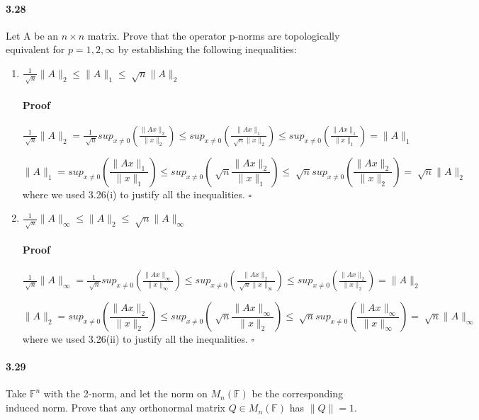 \documentclass[letterpaper,12pt]{article}
\theoremstyle{definition}
\begin{document}
\paragraph{3.28}  Let A be an $n \times n$ matrix. Prove that the operator p-norms are topologically equivalent for $p = 1,2,\infty$ by establishing the following inequalities: 


\begin{enumerate}[label=(\roman*)]

\item $ \frac{1}{\sqrt[]{n}} \| A \|_2 \le \| A \|_1 \le \sqrt[]{n} \| A \|_2 $

\paragraph{Proof} $ \frac{1}{\sqrt[]{n}} \| A \|_2 
= \frac{1}{\sqrt[]{n}} sup_{x \neq 0}( \frac{\| Ax \|_2}{\| x \|_2} )
\le sup_{x \neq 0}( \frac{\| Ax \|_1}{\sqrt[]{n} \| x \|_2})
\le sup_{x \neq 0}( \frac{\| Ax \|_1}{\| x \|_1})
= \| A \|_1$

$$\| A \|_1  =  sup_{x \neq 0}( \frac{\| Ax \|_1}{\| x \|_1})
\le sup_{x \neq 0}(\sqrt[]{n}  \frac{\| Ax \|_2}{\| x \|_1})
\le \sqrt[]{n} sup_{x \neq 0}( \frac{\| Ax \|_2}{\| x \|_2})
= \sqrt[]{n} \| A \|_2 $$
where we used 3.26(i) to justify all the inequalities. $\square$

\item $ \frac{1}{\sqrt[]{n}} \| A \|_{\infty} \le \| A \|_2 \le \sqrt[]{n} \| A \|_{\infty}$

\paragraph{Proof} $ \frac{1}{\sqrt[]{n}} \| A \|_{\infty} 
= \frac{1}{\sqrt[]{n}} sup_{x \neq 0}(\frac{\| Ax \|_{\infty}}{\| x \|_{\infty}}) \le sup_{x \neq 0}(\frac{\| Ax \|_2}{\sqrt[]{n} \| x \|_{\infty}})
\le sup_{x \neq 0}(\frac{\| Ax \|_2}{\| x \|_2})
= \| A \|_2$

$$\| A \|_2  =  sup_{x \neq 0}( \frac{\| Ax \|_2}{\| x \|_2})
\le sup_{x \neq 0}(\sqrt[]{n}  \frac{\| Ax \|_{\infty}}{\| x \|_2})
\le \sqrt[]{n} sup_{x \neq 0}( \frac{\| Ax \|_{\infty}}{\| x \|_{\infty}})
= \sqrt[]{n} \| A \|_{\infty} $$
where we used 3.26(ii) to justify all the inequalities. $\square$

\end{enumerate}



\paragraph{3.29} Take $\mathds{F}^n$ with the 2-norm, and let the norm on  $M_n(\mathds{F})$ be the corresponding induced norm. Prove that any orthonormal matrix $Q \in M_n(\mathds{F})$ has $\|Q\| = 1$. 
\end{document}
